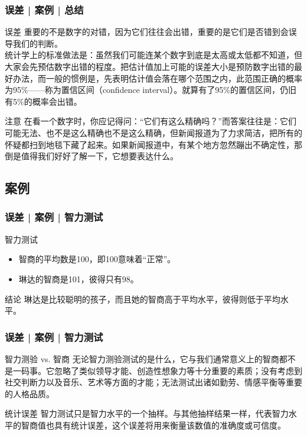 \begin{frame}
  \frametitle{误差 | 案例 | 总结}
  \begin{block}{误差}
    重要的不是数字的对错，因为它们往往会出错，重要的是它们是否错到会误导我们的判断。\\
    \vspace{0.3em}
统计学上的标准做法是：虽然我们可能连某个数字到底是太高或太低都不知道，但大家会先预估数字出错的程度。把估计值加上可能的误差大小是预防数字出错的最好办法，而一般的惯例是，先表明估计值会落在哪个范围之内，此范围正确的概率为95\%——称为置信区间（confidence interval）。就算有了95\%的置信区间，仍旧有5\%的概率会出错。
  \end{block}
  \pause
  \begin{block}{注意}
在看一个数字时，你应记得问：“它们有这么精确吗？”而答案往往是：它们可能无法、也不是这么精确也不是这么精确，但新闻报道为了力求简洁，把所有的怀疑都扫到地毯下藏了起来。如果新闻报道中，有某个地方忽然蹦出不确定性，那倒是值得我们好好了解一下，它想要表达什么。
  \end{block}
\end{frame}

\subsection{案例}
\begin{frame}
  \frametitle{误差 | 案例 | 智力测试}
  \begin{block}{智力测试}
    \begin{itemize}
      \item 智商的平均数是100，即100意味着“正常”。
      \item 琳达的智商是101，彼得只有98。
    \end{itemize}
  \end{block}
  \pause
  \begin{block}{结论}
    琳达是比较聪明的孩子，而且她的智商高于平均水平，彼得则低于平均水平。
  \end{block}
\end{frame}

\begin{frame}
  \frametitle{误差 | 案例 | 智力测试}
  \begin{block}{智力测验 vs. 智商}
    无论智力测验测试的是什么，它与我们通常意义上的智商都不是一码事。它忽略了类似领导才能、创造性想象力等十分重要的素质；没有考虑到社交判断力以及音乐、艺术等方面的才能；无法测试出诸如勤劳、情感平衡等重要的人格品质。
  \end{block}
  \pause
  \begin{block}{统计误差}
    智力测试只是智力水平的一个抽样。与其他抽样结果一样，代表智力水平的智商值也具有统计误差，这个误差将用来衡量该数值的准确度或可信度。
  \end{block}
\end{frame}

